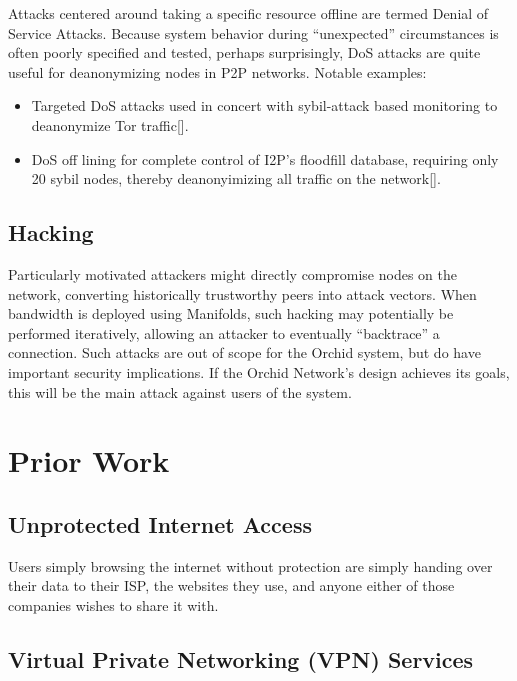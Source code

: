 \documentclass{article}
\newcommand{\mesh}{Orchid}
\begin{document}
Attacks centered around taking a specific resource offline are termed Denial of Service Attacks. Because system behavior during “unexpected” circumstances is often poorly specified and tested, perhaps surprisingly, DoS attacks are quite useful for deanonymizing nodes in P2P networks. Notable examples:

\begin{itemize}
    \item Targeted DoS attacks used in concert with sybil-attack based monitoring to deanonymize Tor traffic[\cite{DOSvsSec}].
    \item DoS off lining for complete control of I2P’s floodfill database, requiring only 20 sybil nodes, thereby deanonyimizing all traffic on the network[\cite{I2P-vigna}].
\end{itemize}

\subsection{Hacking}

Particularly motivated attackers might directly compromise nodes on the network, converting historically trustworthy peers into attack vectors. When bandwidth is deployed using Manifolds, such hacking may potentially be performed iteratively, allowing an attacker to eventually ``backtrace'' a connection. Such attacks are out of scope for the \mesh{} system, but do have important security implications. If the \mesh{} Network's design achieves its goals, this will be the main attack against users of the system.


\section{Prior Work}
\label{sec:prior-work}

\subsection{Unprotected Internet Access}

Users simply browsing the internet without protection are simply handing over their data to their ISP, the websites they use, and anyone either of those companies wishes to share it with.

\subsection{Virtual Private Networking (VPN) Services}
\end{document}
